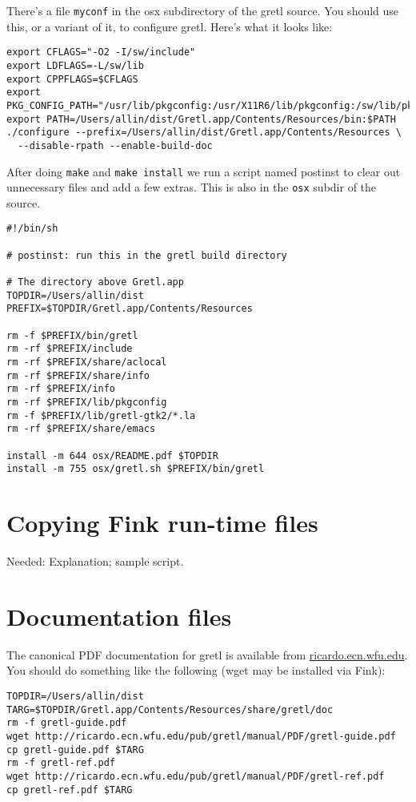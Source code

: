 \documentclass{article}
\begin{document}
There's a file \texttt{myconf} in the osx subdirectory of the gretl
source.  You should use this, or a variant of it, to configure gretl.
Here's what it looks like:

\begin{verbatim}
export CFLAGS="-O2 -I/sw/include"
export LDFLAGS=-L/sw/lib
export CPPFLAGS=$CFLAGS
export PKG_CONFIG_PATH="/usr/lib/pkgconfig:/usr/X11R6/lib/pkgconfig:/sw/lib/pkgconfig"
export PATH=/Users/allin/dist/Gretl.app/Contents/Resources/bin:$PATH
./configure --prefix=/Users/allin/dist/Gretl.app/Contents/Resources \
  --disable-rpath --enable-build-doc
\end{verbatim}

After doing \texttt{make} and \texttt{make install} we run a script
named postinst to clear out unnecessary files and add a few extras.
This is also in the \texttt{osx} subdir of the source.

\begin{verbatim}
#!/bin/sh

# postinst: run this in the gretl build directory

# The directory above Gretl.app
TOPDIR=/Users/allin/dist
PREFIX=$TOPDIR/Gretl.app/Contents/Resources

rm -f $PREFIX/bin/gretl
rm -rf $PREFIX/include
rm -rf $PREFIX/share/aclocal
rm -rf $PREFIX/share/info
rm -rf $PREFIX/info
rm -rf $PREFIX/lib/pkgconfig
rm -f $PREFIX/lib/gretl-gtk2/*.la
rm -rf $PREFIX/share/emacs

install -m 644 osx/README.pdf $TOPDIR
install -m 755 osx/gretl.sh $PREFIX/bin/gretl
\end{verbatim}

\section{Copying Fink run-time files}

Needed: Explanation; sample script.

\section{Documentation files}

The canonical PDF documentation for gretl is available from
\url{ricardo.ecn.wfu.edu}.  You should do something like the following
(wget may be installed via Fink):

\begin{verbatim}
TOPDIR=/Users/allin/dist
TARG=$TOPDIR/Gretl.app/Contents/Resources/share/gretl/doc
rm -f gretl-guide.pdf
wget http://ricardo.ecn.wfu.edu/pub/gretl/manual/PDF/gretl-guide.pdf
cp gretl-guide.pdf $TARG
rm -f gretl-ref.pdf
wget http://ricardo.ecn.wfu.edu/pub/gretl/manual/PDF/gretl-ref.pdf
cp gretl-ref.pdf $TARG
\end{verbatim}
\end{document}
